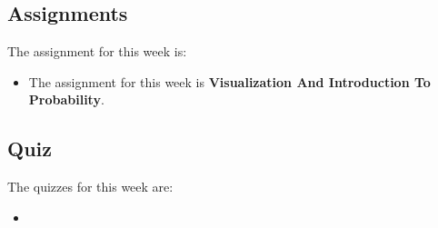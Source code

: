 \subsection{Assignments}

The assignment for this week is:

\begin{itemize}
    \item The assignment for this week is \textbf{Visualization And Introduction To Probability}. 
\end{itemize}

\subsection{Quiz}

The quizzes for this week are:

\begin{itemize}
    \item {} \textbullet {} 
\end{itemize}